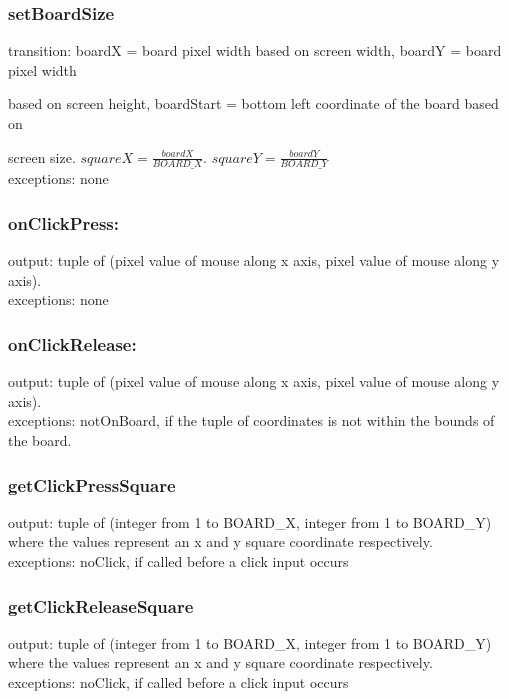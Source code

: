 \documentclass{article}
\begin{document}
        \subsubsection*{setBoardSize} 
            transition: boardX = board pixel width based on screen width, boardY = board pixel width
            
            based on screen height, boardStart = bottom left coordinate of the board based on 
            
            screen size. $squareX = \frac{boardX}{BOARD\_X}$. $squareY = \frac{boardY}{BOARD\_Y}$ \\
            exceptions: none
                
        \subsubsection*{onClickPress:} 
            output: tuple of (pixel value of mouse along x axis, pixel value of mouse along y axis). \\
            exceptions: none
        
        \subsubsection*{onClickRelease:} 
            output: tuple of (pixel value of mouse along x axis, pixel value of mouse along y axis). \\
            exceptions: notOnBoard, if the tuple of coordinates is not within the bounds of the board. 
            
        \subsubsection*{getClickPressSquare} 
            output: tuple of (integer from 1 to BOARD\_X, integer from 1 to BOARD\_Y) where the values represent an x and y square coordinate respectively. \\
            exceptions: noClick, if called before a click input occurs
        
        \subsubsection*{getClickReleaseSquare} 
            output: tuple of (integer from 1 to BOARD\_X, integer from 1 to BOARD\_Y) where the values represent an x and y square coordinate respectively. \\
            exceptions: noClick, if called before a click input occurs
        
\end{document}
